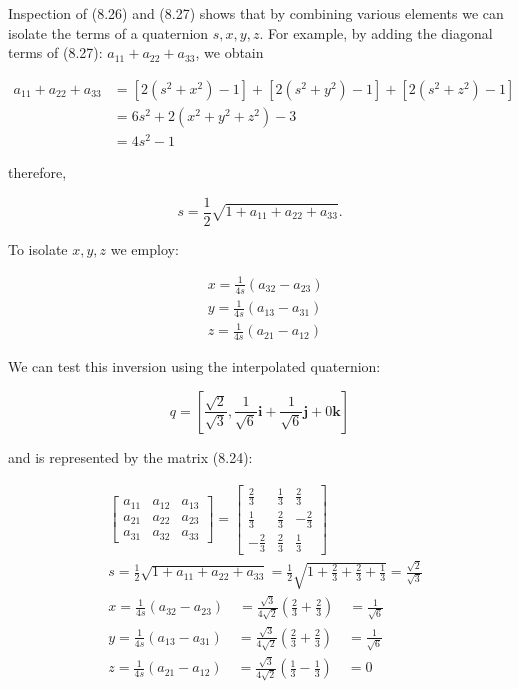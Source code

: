 \documentclass[10pt]{article}
\begin{document}
Inspection of (8.26) and (8.27) shows that by combining various elements we can isolate the terms of a quaternion $s, x, y, z$. For example, by adding the diagonal terms of (8.27): $a_{11}+a_{22}+a_{33}$, we obtain

$$
\begin{aligned}
a_{11}+a_{22}+a_{33} & =\left[2\left(s^{2}+x^{2}\right)-1\right]+\left[2\left(s^{2}+y^{2}\right)-1\right]+\left[2\left(s^{2}+z^{2}\right)-1\right] \\
& =6 s^{2}+2\left(x^{2}+y^{2}+z^{2}\right)-3 \\
& =4 s^{2}-1
\end{aligned}
$$

therefore,

$$
s=\frac{1}{2} \sqrt{1+a_{11}+a_{22}+a_{33}} .
$$

To isolate $x, y, z$ we employ:

$$
\begin{aligned}
& x=\frac{1}{4 s}\left(a_{32}-a_{23}\right) \\
& y=\frac{1}{4 s}\left(a_{13}-a_{31}\right) \\
& z=\frac{1}{4 s}\left(a_{21}-a_{12}\right)
\end{aligned}
$$

We can test this inversion using the interpolated quaternion:

$$
q=\left[\frac{\sqrt{2}}{\sqrt{3}}, \frac{1}{\sqrt{6}} \mathbf{i}+\frac{1}{\sqrt{6}} \mathbf{j}+0 \mathbf{k}\right]
$$

and is represented by the matrix (8.24):

$$
\begin{aligned}
& {\left[\begin{array}{lll}
a_{11} & a_{12} & a_{13} \\
a_{21} & a_{22} & a_{23} \\
a_{31} & a_{32} & a_{33}
\end{array}\right]=\left[\begin{array}{ccc}
\frac{2}{3} & \frac{1}{3} & \frac{2}{3} \\
\frac{1}{3} & \frac{2}{3} & -\frac{2}{3} \\
-\frac{2}{3} & \frac{2}{3} & \frac{1}{3}
\end{array}\right]} \\
& s=\frac{1}{2} \sqrt{1+a_{11}+a_{22}+a_{33}}=\frac{1}{2} \sqrt{1+\frac{2}{3}+\frac{2}{3}+\frac{1}{3}}=\frac{\sqrt{2}}{\sqrt{3}} \\
& x=\frac{1}{4 s}\left(a_{32}-a_{23}\right) \quad=\frac{\sqrt{3}}{4 \sqrt{2}}\left(\frac{2}{3}+\frac{2}{3}\right) \quad=\frac{1}{\sqrt{6}} \\
& y=\frac{1}{4 s}\left(a_{13}-a_{31}\right) \quad=\frac{\sqrt{3}}{4 \sqrt{2}}\left(\frac{2}{3}+\frac{2}{3}\right) \quad=\frac{1}{\sqrt{6}} \\
& z=\frac{1}{4 s}\left(a_{21}-a_{12}\right) \quad=\frac{\sqrt{3}}{4 \sqrt{2}}\left(\frac{1}{3}-\frac{1}{3}\right) \quad=0
\end{aligned}
$$
\end{document}
